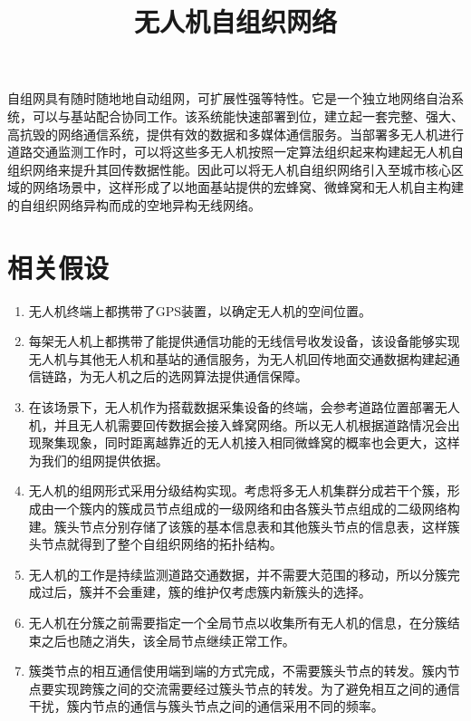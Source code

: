 \documentclass{article}
\begin{document}
  
\title{无人机自组织网络}
\maketitle{}

自组网具有随时随地地自动组网，可扩展性强等特性。它是一个独立地网络自治系统，可以与基站配合协同工作。该系统能快速部署到位，建立起一套完整、强大、高抗毁的网络通信系统，提供有效的数据和多媒体通信服务。当部署多无人机进行道路交通监测工作时，可以将这些多无人机按照一定算法组织起来构建起无人机自组织网络来提升其回传数据性能。因此可以将无人机自组织网络引入至城市核心区域的网络场景中，这样形成了以地面基站提供的宏蜂窝、微蜂窝和无人机自主构建的自组织网络异构而成的空地异构无线网络。

\section{相关假设}

\begin{enumerate}
\item[(1)]无人机终端上都携带了GPS装置，以确定无人机的空间位置。
\item[(2)]每架无人机上都携带了能提供通信功能的无线信号收发设备，该设备能够实现无人机与其他无人机和基站的通信服务，为无人机回传地面交通数据构建起通信链路，为无人机之后的选网算法提供通信保障。
\item[(3)]在该场景下，无人机作为搭载数据采集设备的终端，会参考道路位置部署无人机，并且无人机需要回传数据会接入蜂窝网络。所以无人机根据道路情况会出现聚集现象，同时距离越靠近的无人机接入相同微蜂窝的概率也会更大，这样为我们的组网提供依据。
\item[(4)]无人机的组网形式采用分级结构实现。考虑将多无人机集群分成若干个簇，形成由一个簇内的簇成员节点组成的一级网络和由各簇头节点组成的二级网络构建。簇头节点分别存储了该簇的基本信息表和其他簇头节点的信息表，这样簇头节点就得到了整个自组织网络的拓扑结构。
\item[(5)]无人机的工作是持续监测道路交通数据，并不需要大范围的移动，所以分簇完成过后，簇并不会重建，簇的维护仅考虑簇内新簇头的选择。
\item[(6)]无人机在分簇之前需要指定一个全局节点以收集所有无人机的信息，在分簇结束之后也随之消失，该全局节点继续正常工作。
\item[(7)]簇类节点的相互通信使用端到端的方式完成，不需要簇头节点的转发。簇内节点要实现跨簇之间的交流需要经过簇头节点的转发。为了避免相互之间的通信干扰，簇内节点的通信与簇头节点之间的通信采用不同的频率。
\end{enumerate}
\end{document}
